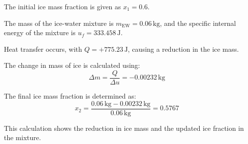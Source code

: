 The initial ice mass fraction is given as \( x_1 = 0.6 \).  

The mass of the ice-water mixture is \( m_{\text{EW}} = 0.06 \, \text{kg} \), and the specific internal energy of the mixture is \( u_f = 333.458 \, \text{J} \).  

Heat transfer occurs, with \( Q = +775.23 \, \text{J} \), causing a reduction in the ice mass.  

The change in mass of ice is calculated using:  
\[
\Delta m = \frac{Q}{\Delta u} = -0.00232 \, \text{kg}
\]  

The final ice mass fraction is determined as:  
\[
x_2 = \frac{0.06 \, \text{kg} - 0.00232 \, \text{kg}}{0.06 \, \text{kg}} = 0.5767
\]  

This calculation shows the reduction in ice mass and the updated ice fraction in the mixture.